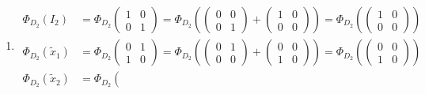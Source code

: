 \documentclass[aps,preprint]{revtex4}
\begin{document}
\begin{enumerate}
\begin{eqnarray}
_{1}\widetilde{x}_{2}\right) \right\} \\
&=&\mathbb{R-}\limfunc{linspan}\left\{ \Phi _{D_{1}}\left( \widetilde{x}%
_{2}\right) ,\Phi _{D_{1}}\left( \widetilde{x}_{1}\right) \right\} =\mathbb{%
R-}\limfunc{linspan}\left\{ \Phi _{D_{1}}\left( \widetilde{x}_{2}\right)
,\Phi _{D_{1}}\left( \widetilde{x}_{1}\widetilde{x}_{2}\right) \right\} \\
&=&\mathbb{R-}\limfunc{linspan}\left\{ \Phi _{D_{1}}\left( I_{2}-\widetilde{x%
}_{2}\right) ,\Phi _{D_{1}}\left( \widetilde{x}_{1}-\widetilde{x}_{1}%
\widetilde{x}_{2}\right) \right\} .
\end{eqnarray}

\item 
\begin{align}
\Phi _{D_{2}}\left( I_{2}\right) & =\Phi _{D_{2}}\left( 
\begin{array}{cc}
1 & 0 \\ 
0 & 1%
\end{array}%
\right) =\Phi _{D_{2}}\left( \left( 
\begin{array}{cc}
0 & 0 \\ 
0 & 1%
\end{array}%
\right) +\left( 
\begin{array}{cc}
1 & 0 \\ 
0 & 0%
\end{array}%
\right) \right) =\Phi _{D_{2}}\left( \left( 
\begin{array}{cc}
1 & 0 \\ 
0 & 0%
\end{array}%
\right) \right) \\
\Phi _{D_{2}}\left( \widetilde{x}_{1}\right) & =\Phi _{D_{2}}\left( 
\begin{array}{cc}
0 & 1 \\ 
1 & 0%
\end{array}%
\right) =\Phi _{D_{2}}\left( \left( 
\begin{array}{cc}
0 & 1 \\ 
0 & 0%
\end{array}%
\right) +\left( 
\begin{array}{cc}
0 & 0 \\ 
1 & 0%
\end{array}%
\right) \right) =\Phi _{D_{2}}\left( \left( 
\begin{array}{cc}
0 & 0 \\ 
1 & 0%
\end{array}%
\right) \right) \\
\Phi _{D_{2}}\left( \widetilde{x}_{2}\right) & =\Phi _{D_{2}}\left( 

\end{align}
\end{enumerate}
\end{document}
